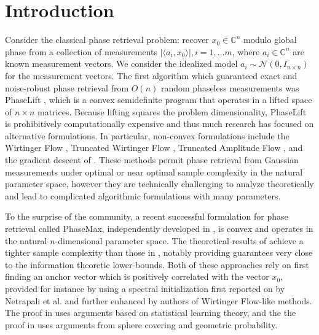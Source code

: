 \documentclass[12pt]{article}
\newcommand{\1}{\mathbf{1}}
\begin{document}
\section{Introduction}
Consider the classical phase retrieval problem: recover $x_0 \in \mathbb{C}^n$ modulo global phase from a collection of measurements $|\langle a_i, x_0 \rangle|, i=1, \ldots m$, where $a_i \in \mathbb{C}^n$ are known measurement vectors. 
We consider the idealized model $a_i \sim \mathcal{N}(0, I_{n \times n})$ for the measurement vectors. The first algorithm which guaranteed exact and noise-robust phase retrieval from $O(n)$ random phaseless measurements was PhaseLift \cite{CESV2011, CSV2013, CL2012}, which is a convex semidefinite program that operates in a lifted space of $n\times n$ matrices.  Because lifting squares the problem dimensionality, PhaseLift is prohibitively computationally expensive and thus much research has focused on alternative formulations. In particular, non-convex formulations include the Wirtinger Flow \cite{wirtinger}, Truncated Wirtinger Flow \cite{twf}, Truncated Amplitude Flow \cite{yoninaTAF}, and the gradient descent of \cite{SQW2016}.  These methods permit phase retrieval from Gaussian measurements under optimal or near optimal sample complexity in the natural parameter space, however they are technically challenging to analyze theoretically and lead to complicated algorithmic formulations with many parameters.  %

To the surprise of the community, a recent successful formulation for phase retrieval called PhaseMax, independently developed in \cite{phasemax, phasemaxJustin}, is convex and operates in the natural $n$-dimensional parameter space.  The theoretical results of \cite{phasemax} achieve a tighter sample complexity than those in \cite{phasemaxJustin}, notably providing guarantees very close to the information theoretic lower-bounds.  Both of these approaches rely on first finding an anchor vector which is positively correlated with the vector $x_0$, provided for instance by using a spectral initialization first reported on by Netrapali et al. \cite{altminphase} and further enhanced by authors of Wirtinger Flow-like methods. The proof in \cite{phasemaxJustin} uses arguments based on statistical learning theory, and the the proof in \cite{phasemax} uses arguments from sphere covering and geometric probability.
\end{document}
